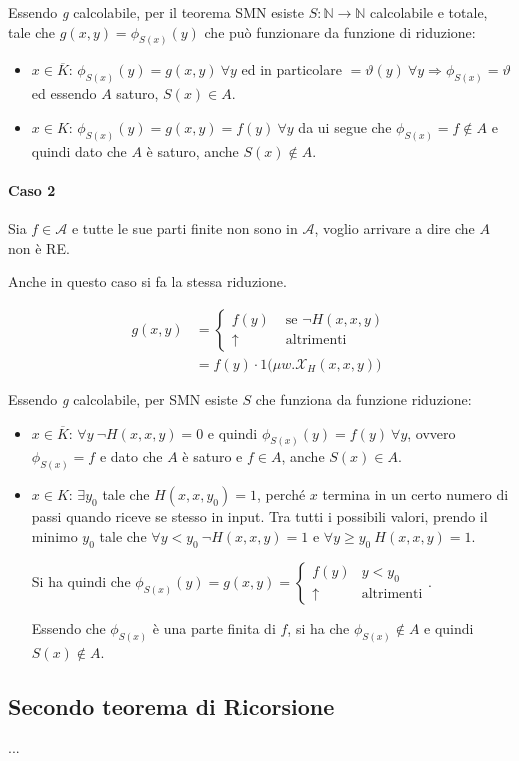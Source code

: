 Essendo \textit{g} calcolabile, per il teorema SMN esiste $S : \mathbb{N} \rightarrow \mathbb{N}$ calcolabile e totale, tale che $g(x,y)  = \phi_{S(x)}(y)$ che può funzionare da funzione di riduzione:

\begin{itemize}
	\item $x \in \overline{K}$: $\phi_{S(x)}(y) = g(x,y) \:\forall y$ ed in particolare $ =  \vartheta(y) \: \forall y \Rightarrow \phi_{S(x)} = \vartheta$ ed essendo $A$ saturo, $S(x) \in A$.
	\item $x \in K$: $\phi_{S(x)}(y) = g(x,y) = f(y)\:\forall y$ da ui segue che $\phi_{S(x)} = f \notin A$ e quindi dato che $A$ è saturo, anche $S(x) \notin A$.
\end{itemize}

\paragraph{Caso 2}

Sia $f \in \mathcal{A}$ e tutte le sue parti finite non sono in $\mathcal{A}$, voglio arrivare a dire che $A$ non è RE.

Anche in questo caso si fa la stessa riduzione.

\begin{align*}
g(x,y) &= \begin{cases}
f(y) &\text{ se } \neg H(x,x,y) \\
\uparrow & \text{ altrimenti}
\end{cases} \\
&= f(y) \cdot 1 \big( \mu w . \mathcal{X}_H (x,x,y) \big)
\end{align*}

Essendo \textit{g} calcolabile, per SMN esiste $S$ che funziona da funzione riduzione:

\begin{itemize}
	\item $x \in \overline{K}$: $\forall y \: \neg H(x,x,y) = 0$ e quindi $\phi_{S(x)}(y) = f(y) \: \forall y$, ovvero $\phi_{S(x)} = f$ e dato che $A$ è saturo e $f \in A$, anche $S(x) \in A$.
	\item $x \in K$: $\exists y_0$ tale che $H(x,x,y_0) = 1$, perché $x$ termina in un certo numero di passi quando riceve se stesso in input. Tra tutti i possibili valori, prendo il minimo $y_0$ tale che $\forall y < y_0 \: \neg H(x,x,y) = 1$ e $\forall y \geq y_0 \: H(x,x,y) = 1 $.
	
	Si ha quindi che $\phi_{S(x)} (y) = g(x,y) = \begin{cases}
	f(y) &y < y_0 \\ 
	\uparrow &\text{altrimenti}
	\end{cases} $.
	
	Essendo che $\phi_{S(x)}$ è una parte finita di $f$, si ha che $\phi_{S(x)} \notin A$ e quindi $S(x) \notin A$. 
\end{itemize}

\subsection{Secondo teorema di Ricorsione}

...